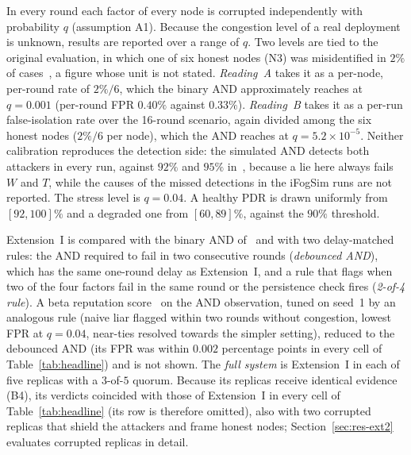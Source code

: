 \documentclass{ieeeaccess}
\begin{document}
In every round each factor of every node is corrupted independently
with probability $q$ (assumption A1).  Because the congestion level of
a real deployment is unknown, results are reported over a range of
$q$.  Two levels are tied to the original evaluation, in which one of
six honest nodes (N3) was misidentified in $2\%$ of
cases~\cite{soula2024iodt}, a figure whose unit is not stated.
\emph{Reading~A} takes it as a per-node, per-round rate of $2\%/6$,
which the binary AND approximately reaches at $q=0.001$ (per-round
FPR $0.40\%$ against $0.33\%$).  \emph{Reading~B} takes it as a
per-run false-isolation rate over the 16-round scenario, again
divided among the six honest nodes ($2\%/6$ per node), which the AND
reaches at $q=5.2\times10^{-5}$.  Neither calibration
reproduces the detection side: the simulated AND detects both attackers
in every run, against $92\%$ and $95\%$ in~\cite{soula2024iodt},
because a lie here always fails $W$ and $T$, while the causes of the
missed detections in the iFogSim runs are not reported.  The stress
level is $q=0.04$.  A healthy PDR is drawn uniformly from $[92,100]\%$
and a degraded one from $[60,89]\%$, against the $90\%$ threshold.

Extension~I is compared with the binary AND of~\cite{soula2024iodt}
and with two delay-matched rules: the AND required to fail in two
consecutive rounds (\emph{debounced AND}), which has the same one-round
delay as Extension~I, and a rule that flags when two of the four
factors fail in the same round or the persistence check fires
(\emph{2-of-4 rule}).  A beta reputation score~\cite{josang2002beta}
on the AND observation, tuned on seed~1 by an analogous rule
(naive liar flagged within two rounds without congestion, lowest FPR
at $q=0.04$, near-ties resolved towards the simpler setting),
reduced to the debounced AND (its FPR was within $0.002$ percentage
points in every cell of Table~\ref{tab:headline}) and is not shown.
The \emph{full system} is Extension~I in each of five replicas with a
$3$-of-$5$ quorum.  Because its replicas receive identical evidence
(B4), its verdicts coincided with those of Extension~I in every cell
of Table~\ref{tab:headline} (its row is therefore omitted), also with two corrupted replicas that
shield the attackers and frame honest nodes;
Section~\ref{sec:res-ext2} evaluates corrupted replicas in detail.
\end{document}
